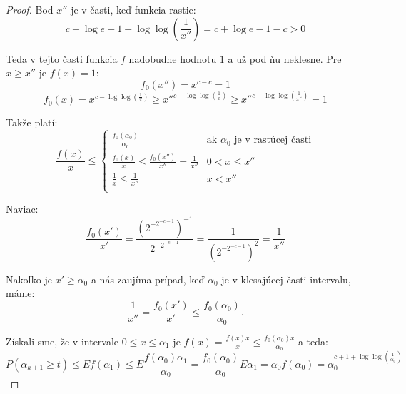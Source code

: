 \begin{proof}
Bod $x''$ je v časti, keď funkcia rastie:
\begin{displaymath}
c + \log e - 1 + \log \log \left(\frac{1}{x''}\right) = c + \log e - 1 - c > 0
\end{displaymath}

Teda v tejto časti funkcia $f$ nadobudne hodnotu $1$ a už pod ňu neklesne. Pre $x \geq x''$ je $f(x) = 1$:
\begin{displaymath}
f_0(x'') = x^{c - c} = 1
\end{displaymath}
\begin{displaymath}
f_0(x) = x^{c - \log \log \left(\frac{1}{x}\right)} \geq {x''}^{c - \log \log \left(\frac{1}{x}\right)} \geq {x''}^{c - \log \log \left(\frac{1}{x''}\right)} = 1
\end{displaymath}

Takže platí:
\begin{displaymath}
\frac{f(x)}{x} \leq 
  \begin{cases} 
  	\frac{f_0(\alpha_0)}{\alpha_0} & \text{ak } \alpha_0 \text{ je v rastúcej časti} \\
  	\frac{f_0(x)}{x} \leq \frac{f_0(x'')}{x''} = \frac{1}{x''} & 0 < x \leq x'' \\
  	\frac{1}{x} \leq \frac{1}{x''} & x < x'' \\
  \end{cases}
\end{displaymath}

Naviac:
\begin{displaymath}
\frac{f_0(x')}{x'} = \frac{\left({2 ^ {-2 ^ {-c - 1}}}\right)^{-1}}{2 ^ {-2 ^ {-c - 1}}} = \frac{1}{\left({2 ^ {-2 ^ {-c - 1}}}\right)^2} = \frac{1}{x''}
\end{displaymath}

Nakoľko je $x' \geq \alpha_0$ a nás zaujíma prípad, keď $\alpha_0$ je v klesajúcej časti intervalu, máme:
\begin{displaymath}
\frac{1}{x''} = \frac{f_0(x')}{x'} \leq \frac{{f_0}(\alpha_0)}{\alpha_0}\textit{.}
\end{displaymath}

Získali sme, že v intervale $0 \leq x \leq \alpha_1$ je $f(x) = \frac{f(x)x}{x} \leq \frac{f_0(\alpha_0)x}{\alpha_0}$ a teda:
\begin{displaymath}
P(\alpha_{k+1} \geq t) \leq E f(\alpha_1) \leq E \frac{f(\alpha_0)\alpha_1}{\alpha_0} = \frac{f_0(\alpha_0)}{\alpha_0}E \alpha_1 = \alpha_0 f(\alpha_0) = \alpha_0^{c + 1 + \log \log \left(\frac{1}{\alpha_0}\right)}
\end{displaymath}

\end{proof}

